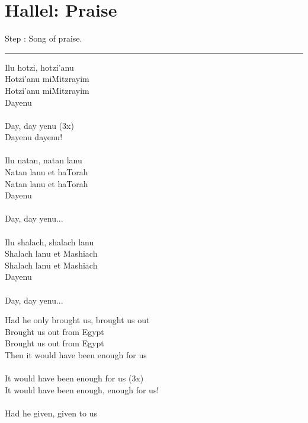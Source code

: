 \documentclass[10pt,oneside,footinclude=true,headinclude=true]{scrbook} %
\newcommand{\drawimage}[4]{
	\makebox[0pt][s]{
		\raisebox{#1}[0pt][0pt]{
			\transparent{#2}\texttt{[image: \#4]}
		}
	}
}
\begin{document}
\chapter{Hallel: Praise}
\normalsize
Step \thechapter: Song of praise.

\vspace{5mm}
\hrule
\vspace{5mm}

\footnotesize
{}
\begin{paracol}{2}
\begin{leftcolumn}
\noindent Ilu hotzi, hotzi'anu\\
Hotzi'anu miMitzrayim\\
Hotzi'anu miMitzrayim\\
Dayenu\\
\\
Day, day yenu (3x)\\
Dayenu dayenu!\\
\\
Ilu natan, natan lanu\\
Natan lanu et haTorah\\
Natan lanu et haTorah\\
Dayenu\\
\\
Day, day yenu...\\
\\
Ilu shalach, shalach lanu\\
Shalach lanu et Mashiach\\
Shalach lanu et Mashiach\\
Dayenu\\
\\
Day, day yenu...\\
\end{leftcolumn}
\begin{rightcolumn}
\noindent Had he only brought us, brought us out\\
Brought us out from Egypt\\
Brought us out from Egypt\\
Then it would have been enough for us\\
\\
It would have been enough for us (3x)\\
It would have been enough, enough for us!\\
\\
Had he given, given to us\\

\end{rightcolumn}
\end{paracol}
\end{document}
